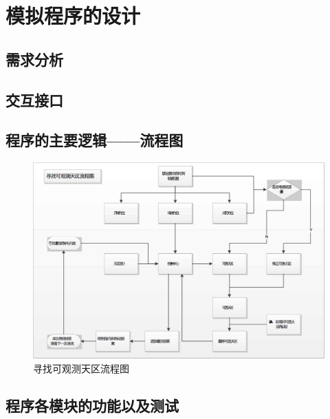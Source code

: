 
\chapter{模拟程序的设计}


\section{需求分析}


\section{交互接口}

\section{程序的主要逻辑——流程图}


\begin{figure}
\centering
\includegraphics[width=\textwidth]{figs/flowchart.png}
\caption{寻找可观测天区流程图}
\label{fig:flow}
\end{figure}

\section{程序各模块的功能以及测试}
